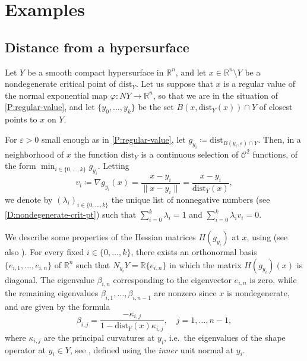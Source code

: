 \documentclass{amsart}
\newcommand{\R}{\mathbb{R}}
\newcommand{\dd}{\mathrm{dist}}
\theoremstyle{definition}
\theoremstyle{remark}
\begin{document}
\section{Examples}



\subsection{Distance from a hypersurface}
\label{subsec:disthyper}

Let $Y$ be a smooth compact hypersurface in $\mathbb{R}^n$, and let $x\in \mathbb{R}^n \setminus Y$ be a nondegenerate critical point of $\dd_Y$. Let us suppose that $x$ is a regular value of the normal exponential map $\varphi \colon NY \to \R^n$, so that we are in the situation of \cref{P:regular-value}, and let $\{y_0, \ldots, y_k\}$ be the set $B(x, \dd_Y(x)) \cap Y$ of closest points to $x$ on $Y$. 

For $\varepsilon >0$ small enough as in \cref{P:regular-value}, let $g_{y_i} \coloneqq \text{dist}_{B(y_i, \varepsilon) \cap Y}$.
Then, in a neighborhood of $x$ the function $\dd_Y$ is a continuous selection of $\mathcal{C}^2$ functions, of the form $\min_{i\in \{0,\ldots ,k\} } g_{y_i}$. Letting 
\begin{equation}\label{eq:vi}
v_i \coloneqq \nabla g_{y_i} (x) = \frac{x-y_i}{\| x-y_i \|} = \frac{x-y_i}{\dd_Y (x)},
\end{equation}
we denote by $(\lambda_i)_{i\in \{0,\ldots ,k\}}$ the unique list of nonnegative numbers (see \cref{D:nondegenerate-crit-pt}) such that $\sum_{i=0}^k \lambda_i =1$ and $\sum_{i=0}^k \lambda_i v_i=0$. 

We describe some properties of the Hessian matrices $H(g_{y_i})$ at $x$, using \cite[Theorem~3.2]{ambrosio1996level} (see also \cite[Section~3]{mantegazza2010notes}). 
For every fixed $i\in\{0,\ldots,k\}$, there exists an orthonormal basis $\{e_{i,1}, \ldots , e_{i,n}\}$ of $\mathbb{R}^n$ such that $N_{y_i}Y = \R \{e_{i,n}\}$ in which the matrix $H(g_{y_i})(x)$ is diagonal. The eigenvalue $\beta_{i,n}$ corresponding to the eigenvector $e_{i,n}$ is zero, while the remaining eigenvalues $\beta_{i,1},\ldots ,\beta_{i,n-1}$ are nonzero since $x$ is nondegenerate, and are given by the formula
\begin{equation}\label{eq:betaij}
\beta_{i,j} = \frac{-\kappa_{i,j}}{1 - \dd_Y(x)\kappa_{i,j}}, \quad j=1,\ldots ,n-1,
\end{equation}
where $\kappa_{i,j}$ are the principal curvatures at $y_i$, i.e.\ the eigenvalues of the shape operator at $y_i \in Y$, see \cite[Chapter 8]{Lee1997}, defined using the \emph{inner} unit normal at $y_i$.
\end{document}
